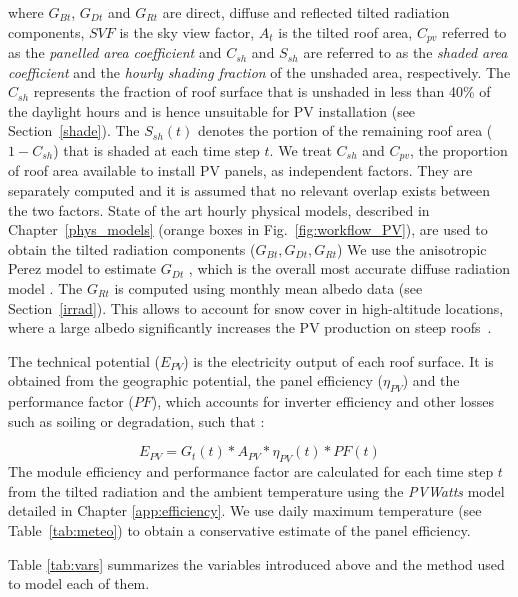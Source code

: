 where $G_{Bt}$, $G_{Dt}$ and $G_{Rt}$ are direct, diffuse and reflected tilted radiation components, $SVF$ is the sky view factor, $A_{t}$ is the tilted roof area, $C_{pv}$ referred to as the \textit{panelled area coefficient} and $C_{sh}$ and $S_{sh}$ are referred to as the \textit{shaded area coefficient} and the \textit{hourly shading fraction} of the unshaded area, respectively.
%
The $C_{sh}$ represents the fraction of roof surface that is unshaded in less than 40\% of the daylight hours and is hence unsuitable for PV installation (see Section~\ref{shade}). The $S_{sh}(t)$ denotes the portion of the remaining roof area ($1 - C_{sh}$) that is shaded at each time step $t$. 
We treat $C_{sh}$ and $C_{pv}$, the proportion of roof area available to install PV panels, as independent factors. They are separately computed and it is assumed that no relevant overlap exists between the two factors. 
%
State of the art hourly physical models, described in Chapter~\ref{phys_models} (orange boxes in Fig.~\ref{fig:workflow_PV}), are used to obtain the tilted radiation components ($G_{Bt}, G_{Dt}, G_{Rt}$) 
We use the anisotropic Perez model \cite{perez_modeling_1990} to estimate $G_{Dt}$ , which is the overall most accurate diffuse radiation model \cite{noorian_evaluation_2008, loutzenhiser_empirical_2007}. 
The $G_{Rt}$ is computed using monthly mean albedo data (see Section~\ref{irrad}). This allows to account for snow cover in high-altitude locations, where a large albedo significantly increases the PV production on steep roofs~\cite{kahl_bright_2019}.

The technical potential ($E_{PV}$) is the electricity output of each roof surface. It is obtained from the geographic potential, the panel efficiency ($\eta_{PV}$) and the performance factor ($PF$), which accounts for inverter efficiency and other losses such as soiling or degradation, such that \cite{assouline_large-scale_2018}:

\begin{equation}
\label{eq:pv}
E_{PV} = G_t(t) * A_{PV} * \eta_{PV}(t) * PF(t)
\end{equation}
The module efficiency and performance factor are calculated for each time step $t$ from the tilted radiation and the ambient temperature using the \textit{PVWatts} model~\cite{dobos_pvwatts_2014} detailed in Chapter \ref{app:efficiency}. We use daily maximum temperature (see Table~\ref{tab:meteo}) to obtain a conservative estimate of the panel efficiency. 

Table \ref{tab:vars} summarizes the variables introduced above and the method used to model each of them. 

